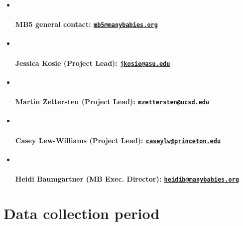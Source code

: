 \documentclass[
]{book}
\begin{document}
\begin{itemize}
\item ~
  \paragraph*{\texorpdfstring{MB5 general contact: \href{mailto:mb5@manybabies.org}{\nolinkurl{mb5@manybabies.org}} }{MB5 general contact: mb5@manybabies.org }}\label{mb5-general-contact-mb5manybabies.org}
\item ~
  \paragraph{\texorpdfstring{Jessica Kosie (Project Lead): \href{mailto:jkosie@asu.edu}{\nolinkurl{jkosie@asu.edu}}}{Jessica Kosie (Project Lead): jkosie@asu.edu}}\label{jessica-kosie-project-lead-jkosieasu.edu}
\item ~
  \paragraph{\texorpdfstring{Martin Zettersten (Project Lead): \href{mailto:mzettersten@ucsd.edu}{\nolinkurl{mzettersten@ucsd.edu}}}{Martin Zettersten (Project Lead): mzettersten@ucsd.edu}}\label{martin-zettersten-project-lead-mzetterstenucsd.edu}
\item ~
  \paragraph{\texorpdfstring{Casey Lew-Williams (Project Lead): \href{mailto:caseylw@princeton.edu}{\nolinkurl{caseylw@princeton.edu}}}{Casey Lew-Williams (Project Lead): caseylw@princeton.edu}}\label{casey-lew-williams-project-lead-caseylwprinceton.edu}
\item ~
  \paragraph{\texorpdfstring{Heidi Baumgartner (MB Exec. Director): \href{mailto:heidib@manybabies.org}{\nolinkurl{heidib@manybabies.org}}}{Heidi Baumgartner (MB Exec. Director): heidib@manybabies.org}}\label{heidi-baumgartner-mb-exec.-director-heidibmanybabies.org}
\end{itemize}

\section*{Data collection period}\label{data-collection-period}
\end{document}
